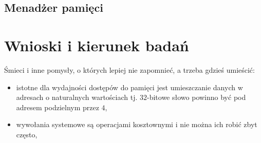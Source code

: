 \documentclass[12pt,a4paper,titlepage,twoside]{mwart}
\begin{document}
\newpage

\subsection{Menadżer pamięci}

\newpage


\section{Wnioski i kierunek badań}

Śmieci i inne pomysły, o których lepiej nie zapomnieć, a trzeba gdzieś umieścić:
\begin{itemize}
\item istotne dla wydajności dostępów do pamięci jest umieszczanie danych w
adresach o naturalnych wartościach tj. $32$-bitowe słowo powinno być pod
adresem podzielnym przez $4$,
\item wywołania systemowe są operacjami kosztownymi i nie można ich robić zbyt często,
\end{itemize}
\end{document}
